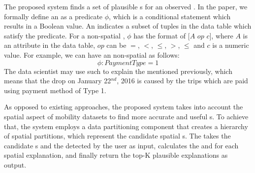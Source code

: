 The proposed system finds a set of plausible {\explanation}s for an observed {\fact}. In the paper, we formally define an {\explanation} as a predicate $\phi$, which is a conditional statement which results in a Boolean value. An {\explanation} indicates a subset of tuples in the data table which satisfy the predicate. For a non-spatial {\explanation}, $\phi$ has the format of $[A$ $op$ $c]$, where $A$ is an attribute in the data table, $op$ can be $=$, $<$, $\leq$, $>$, $\leq$ and $c$ is a numeric value. For example, we can have an non-spatial {\explanation} as follows:
$$\phi: PaymentType = 1$$
The data scientist may use such {\explanation} to explain the {\fact} mentioned previously, which means that the drop on January 22$^{nd}$, 2016 is caused by the trips which are paid using payment method of Type 1.


As opposed to existing approaches, the proposed system takes into account the spatial aspect of mobility datasets to find more accurate and useful {\explanation}s.
To achieve that, the system employs a data partitioning component that creates a hierarchy of spatial partitions, which represent the candidate spatial {\explanation}s. %
The {\evaluator} takes the candidate {\explanation}s and the {\fact} detected by the user as input, calculates the {\intensity} and {\influence} for each spatial explanation, and finally return the top-K plausible explanations as output.




